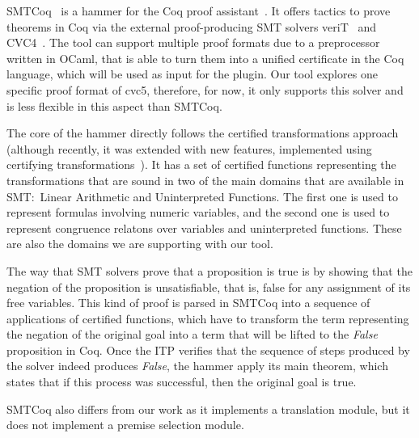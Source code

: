 SMTCoq~\cite{smtcoq} is a hammer for the Coq proof assistant~\cite{Bertot2004}.
It offers tactics to prove theorems in Coq via the external proof-producing SMT
solvers veriT~\cite{Bouton2009} and CVC4~\cite{Barrett2011}. The tool can support multiple proof formats
due to a preprocessor written in OCaml, that is able to turn them
into a unified certificate in the Coq language,
which will be used as input for the plugin. Our tool explores one specific
proof format of cvc5, therefore, for now, it only supports this solver and is
less flexible in this aspect than SMTCoq.

The core of the hammer directly follows the certified transformations approach (although recently, it was
extended with new features, implemented using certifying transformations~\cite{snipe}).
It has a set of certified functions representing the transformations
that are sound in two of the main domains that are available in SMT:\
Linear Arithmetic and Uninterpreted Functions. The first one is used to
represent formulas involving numeric variables, and the second one is
used to represent congruence relatons over variables and uninterpreted functions.
These are also the domains we are supporting with our tool.

The way that SMT solvers prove
that a proposition is true is by showing that the negation of the proposition is unsatisfiable,
that is, false for any assignment of its free variables. This kind of proof
is parsed in SMTCoq into a sequence of applications of certified functions, which have
to transform the term representing the negation of the original goal into a
term that will be lifted to the \textit{False} proposition in Coq. Once the
ITP verifies that the sequence of steps produced by the solver indeed
produces \textit{False}, the hammer apply its main theorem, which states that if
this process was successful, then the original goal is true.

SMTCoq also differs from our work as it implements a translation module, but
it does not implement a premise selection module.
